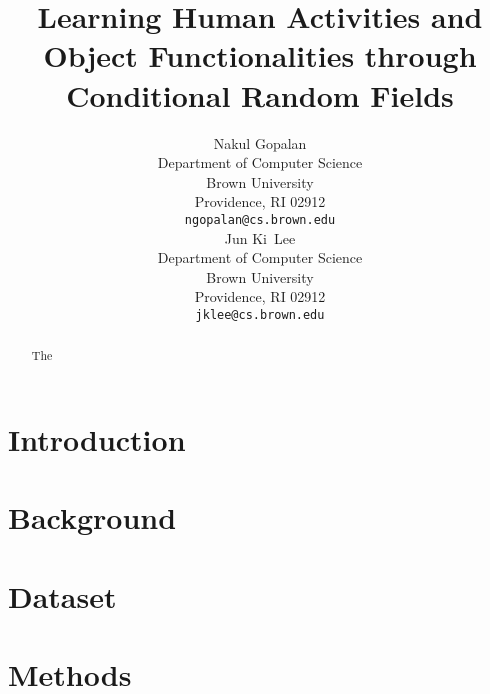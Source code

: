 \documentclass{article} %
\title{Learning Human Activities and Object Functionalities through Conditional Random Fields}
\author{
Nakul Gopalan\\
Department of Computer Science\\
Brown University\\
Providence, RI 02912 \\
\texttt{ngopalan@cs.brown.edu} \\
\And
Jun Ki~Lee\\
Department of Computer Science\\
Brown University\\
Providence, RI 02912 \\
\texttt{jklee@cs.brown.edu} \\
}
\begin{document}
\maketitle

\begin{abstract}
The 
\end{abstract}

\section{Introduction}

\section{Background}
\section{Dataset}
\section{Methods}

%
\end{document}
